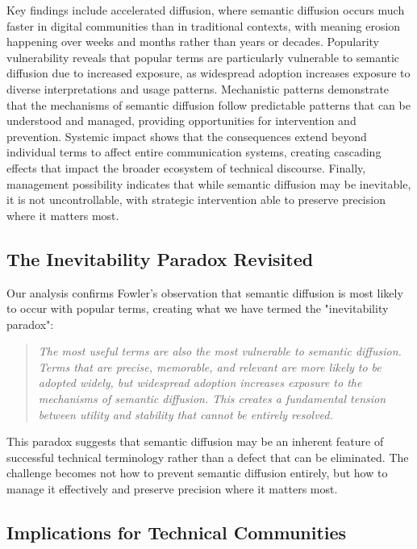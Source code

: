 \documentclass[11pt]{article}
\begin{document}
Key findings include accelerated diffusion, where semantic diffusion occurs much faster in digital communities than in traditional contexts, with meaning erosion happening over weeks and months rather than years or decades. Popularity vulnerability reveals that popular terms are particularly vulnerable to semantic diffusion due to increased exposure, as widespread adoption increases exposure to diverse interpretations and usage patterns. Mechanistic patterns demonstrate that the mechanisms of semantic diffusion follow predictable patterns that can be understood and managed, providing opportunities for intervention and prevention. Systemic impact shows that the consequences extend beyond individual terms to affect entire communication systems, creating cascading effects that impact the broader ecosystem of technical discourse. Finally, management possibility indicates that while semantic diffusion may be inevitable, it is not uncontrollable, with strategic intervention able to preserve precision where it matters most.

\subsection{The Inevitability Paradox Revisited}

Our analysis confirms Fowler's observation that semantic diffusion is most likely to occur with popular terms, creating what we have termed the "inevitability paradox":

\begin{quote}
\emph{The most useful terms are also the most vulnerable to semantic diffusion. Terms that are precise, memorable, and relevant are more likely to be adopted widely, but widespread adoption increases exposure to the mechanisms of semantic diffusion. This creates a fundamental tension between utility and stability that cannot be entirely resolved.}
\end{quote}

This paradox suggests that semantic diffusion may be an inherent feature of successful technical terminology rather than a defect that can be eliminated. The challenge becomes not how to prevent semantic diffusion entirely, but how to manage it effectively and preserve precision where it matters most.

\subsection{Implications for Technical Communities}
\end{document}
